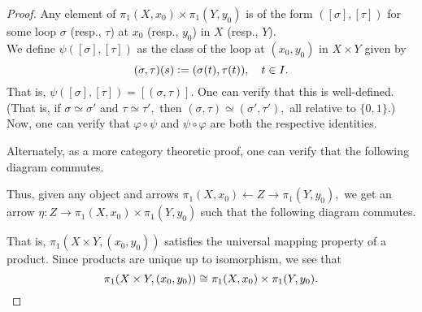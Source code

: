\documentclass[12pt]{article}
\theoremstyle{definition}
\numberwithin{thm}{section}
\begin{document}
\begin{proof}
	Any element of $\pi_1(X, x_0) \times \pi_1(Y, y_0)$ is of the form $([\sigma], [\tau])$ for some loop $\sigma$ (resp., $\tau$) at $x_0$ (resp., $y_0$) in $X$ (resp., $Y$).\\
	We define $\psi([\sigma], [\tau])$ as the class of the loop at $(x_0, y_0)$ in $X \times Y$ given by
	\begin{equation*} 
		(\sigma, \tau)(s) \vcentcolon= (\sigma(t), \tau(t)), \quad t \in I.
	\end{equation*}
	That is, $\psi([\sigma], [\tau]) = [(\sigma, \tau)].$ One can verify that this is well-defined.\\
	(That is, if $\sigma \simeq \sigma'$ and $\tau \simeq \tau',$ then $(\sigma, \tau) \simeq (\sigma', \tau'),$ all relative to $\{0, 1\}.$)\\
	Now, one can verify that $\varphi\circ\psi$ and $\psi\circ\varphi$ are both the respective identities. 

	Alternately, as a more category theoretic proof, one can verify that the following diagram commutes.
	\begin{center}
	\end{center}
	Thus, given any object and arrows $\pi_1(X, x_0) \longleftarrow Z \longrightarrow \pi_1(Y, y_0),$ we get an arrow $\eta:Z \longrightarrow \pi_1(X, x_0) \times \pi_1(Y, y_0)$ such that the following diagram commutes.
	\begin{center}
	\end{center}
	That is, $\pi_1(X \times Y, (x_0, y_0))$ satisfies the universal mapping property of a product. Since products are unique up to isomorphism, we see that
	\begin{equation*} 
		\pi_1(X \times Y, (x_0, y_0)) \cong \pi_1(X, x_0) \times \pi_1(Y, y_0). \qedhere
	\end{equation*}
\end{proof}
\end{document}
